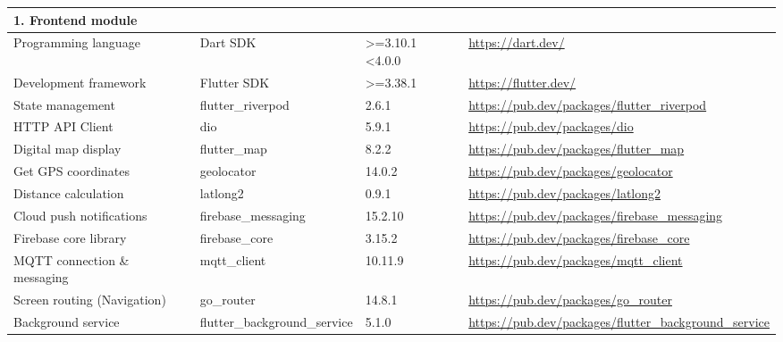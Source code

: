 \documentclass[../Main.tex]{subfiles}
\begin{document}
\begin{longtable}{ p{} p{} p{} p{} }
    \multicolumn{4}{l}{\textbf{1. Frontend module}}                                                                           \\ \hline
    Programming language            & Dart SDK                              & >=3.10.1 <4.0.0  & \url{https://dart.dev/}                                         \\
    Development framework           & Flutter SDK                           & >=3.38.1         & \url{https://flutter.dev/}                                      \\
    State management                & flutter\_riverpod                     & 2.6.1            & \url{https://pub.dev/packages/flutter_riverpod}                 \\
    HTTP API Client                 & dio                                   & 5.9.1            & \url{https://pub.dev/packages/dio}                              \\
    Digital map display             & flutter\_map                          & 8.2.2            & \url{https://pub.dev/packages/flutter_map}                      \\
    Get GPS coordinates             & geolocator                            & 14.0.2           & \url{https://pub.dev/packages/geolocator}                       \\
    Distance calculation            & latlong2                              & 0.9.1            & \url{https://pub.dev/packages/latlong2}                         \\
    Cloud push notifications        & firebase\_messaging                   & 15.2.10          & \url{https://pub.dev/packages/firebase_messaging}               \\
    Firebase core library           & firebase\_core                        & 3.15.2           & \url{https://pub.dev/packages/firebase_core}                    \\
    MQTT connection \& messaging    & mqtt\_client                          & 10.11.9          & \url{https://pub.dev/packages/mqtt_client}                      \\
    Screen routing (Navigation)     & go\_router                            & 14.8.1           & \url{https://pub.dev/packages/go_router}                        \\
    Background service              & flutter\_background\newline\_service  & 5.1.0            & \url{https://pub.dev/packages/flutter_background_service}       \\

\end{longtable}
\end{document}
